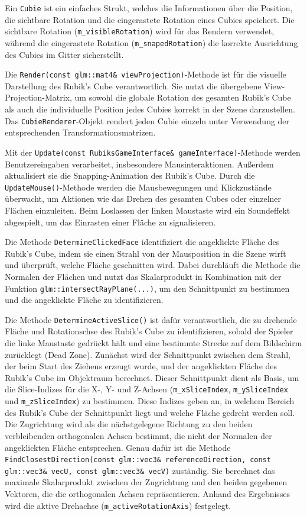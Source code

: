 Ein \texttt{Cubie} ist ein einfaches Strukt, welches die Informationen über die Position, die sichtbare Rotation und die eingerastete Rotation eines Cubies speichert. Die sichtbare Rotation (\texttt{m\_visibleRotation}) wird für das Rendern verwendet, während die eingerastete Rotation (\texttt{m\_snapedRotation}) die korrekte Ausrichtung des Cubies im Gitter sicherstellt.

Die \texttt{Render(const glm::mat4\& viewProjection)}-Methode ist für die visuelle Darstellung des Rubik's Cube verantwortlich. Sie nutzt die übergebene View-Projection-Matrix, um sowohl die globale Rotation des gesamten Rubik's Cube als auch die individuelle Position jedes Cubies korrekt in der Szene darzustellen. Das \texttt{CubieRenderer}-Objekt rendert jeden Cubie einzeln unter Verwendung der entsprechenden Transformationsmatrizen.

Mit der \texttt{Update(const RubiksGameInterface\& gameInterface)}-Methode werden Benutzereingaben verarbeitet, insbesondere Mausinteraktionen. Außerdem aktualisiert sie die Snapping-Animation des Rubik's Cube. Durch die \texttt{UpdateMouse()}-Methode werden die Mausbewegungen und Klickzustände überwacht, um Aktionen wie das Drehen des gesamten Cubes oder einzelner Flächen einzuleiten. Beim Loslassen der linken Maustaste wird ein Soundeffekt abgespielt, um das Einrasten einer Fläche zu signalisieren.

Die Methode \texttt{DetermineClickedFace} identifiziert die angeklickte Fläche des Rubik's Cube, indem sie einen Strahl von der Mausposition in die Szene wirft und überprüft, welche Fläche geschnitten wird. Dabei durchläuft die Methode die Normalen der Flächen und nutzt das Skalarprodukt in Kombination mit der Funktion \texttt{glm::intersectRayPlane(...)}, um den Schnittpunkt zu bestimmen und die angeklickte Fläche zu identifizieren.

Die Methode \texttt{DetermineActiveSlice()} ist dafür verantwortlich, die zu drehende Fläche und Rotationschse des Rubik's Cube zu identifizieren, sobald der Spieler die linke Maustaste gedrückt hält und eine bestimmte Strecke auf dem Bildschirm zurücklegt (Dead Zone). 
Zunächst wird der Schnittpunkt zwischen dem Strahl, der beim Start des Ziehens erzeugt wurde, und der angeklickten Fläche des Rubik's Cube im Objektraum berechnet. Dieser Schnittpunkt dient als Basis, um die Slice-Indizes für die X-, Y- und Z-Achsen (\texttt{m\_xSliceIndex}, \texttt{m\_ySliceIndex} und \texttt{m\_zSliceIndex}) zu bestimmen. Diese Indizes geben an, in welchem Bereich des Rubik's Cube der Schnittpunkt liegt und welche Fläche gedreht werden soll.
Die Zugrichtung wird als die nächstgelegene Richtung zu den beiden verbleibenden orthogonalen Achsen bestimmt, die nicht der Normalen der angeklickten Fläche entsprechen.
Genau dafür ist die Methode \texttt{FindClosestDirection(const glm::vec3\& referenceDirection, const glm::vec3\& vecU, const glm::vec3\& vecV)} zu\-ständig. Sie berechnet das maximale Skalarprodukt zwischen der Zugrichtung und den beiden gegebenen Vektoren, die die orthogonalen Achsen repräsentieren. Anhand des Ergebnisses wird die aktive Drehachse (\texttt{m\_activeRotationAxis}) festgelegt.

